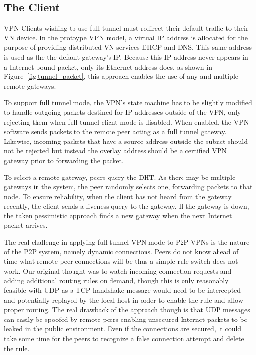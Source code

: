 \subsection{The Client}
VPN Clients wishing to use full tunnel must redirect their default traffic to
their VN device.  In the protoype VPN model, a virtual IP address is allocated
for the purpose of providing distributed VN services DHCP and DNS.  This same
address is used as the the default gateway's IP.  Because this IP address never
appears in a Internet bound packet, only its Ethernet address does, as shown in
Figure~\ref{fig:tunnel_packet}, this approach enables the use of any and
multiple remote gateways.

To support full tunnel mode, the VPN's state machine has to be slightly modified
to handle outgoing packets destined for IP addresses outside of the VPN, only
rejecting them when full tunnel client mode is disabled.  When enabled, the VPN
software sends packets to the remote peer acting as a full tunnel gateway.
Likewise, incoming packets that have a source address outside the subnet should
not be rejected but instead the overlay address should be a certified VPN
gateway prior to forwarding the packet.

To select a remote gateway, peers query the DHT.  As there may be multiple
gateways in the system, the peer randomly selects one, forwarding packets to
that node.  To ensure reliability, when the client has not heard from the
gateway recently, the client sends a liveness query to the gateway.  If the
gateway is down, the taken pessimistic approach finds a new gateway when
the next Internet packet arrives.

The real challenge in applying full tunnel VPN mode to P2P VPNs is the nature
of the P2P system, namely dynamic connections.  Peers do not know ahead of time
what remote peer connections will be thus a simple rule switch does not work.
Our original thought was to watch incoming connection requests and adding
additional routing rules on demand, though this is only reasonably feasible
with UDP as a TCP handshake message would need to be intercepted and potentially
replayed by the local host in order to enable the rule and allow proper routing.
The real drawback of the approach though is that UDP messages can easily be
spoofed by remote peers enabling unsecured Internet packets to be leaked in the
public environment.  Even if the connections are secured, it could take some
time for the peers to recognize a false connection attempt and delete the rule.

